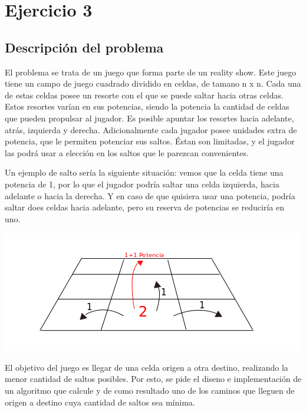 \section{Ejercicio 3}

\subsection{Descripci\'on del problema} \label{ej_3:descripcion}

El problema se trata de un juego que forma parte de un reality show. Este juego tiene un campo de juego cuadrado dividido en celdas, de tamano n x n. Cada una de estas celdas posee un resorte con el que se puede saltar hacia otras celdas. Estos resortes var\'ian en sus potencias, siendo la potencia la cantidad de celdas que pueden propulsar al jugador. Es posible apuntar los resortes hacia adelante, atr\'as, izquierda y derecha. Adicionalmente cada jugador posee unidades extra de potencia, que le permiten potenciar sus saltos.  \'Estan son limitadas, y el jugador las podr\'a usar a elecci\'on en los saltos que le parezcan convenientes.

\vspace{2mm}

Un ejemplo de salto ser\'ia la siguiente situaci\'on: vemos que la celda tiene una potencia de 1, por lo que el jugador podr\'ia saltar una celda izquierda, hacia adelante o hacia la derecha. Y en caso de que quisiera usar una potencia, podr\'ia saltar does celdas hacia adelante, pero su reserva de potencias se reducir\'ia en uno.
 \vspace{2mm}

\includegraphics[scale=0.8]{images/saltos}

El objetivo del juego es llegar de una celda origen a otra destino, realizando la menor cantidad de saltos posibles. Por esto, se pide el diseno e implementaci\'on de un algoritmo que calcule y de como resultado uno de los caminos que lleguen de origen a destino cuya cantidad de saltos sea m\'inima.
\vspace{2mm}


